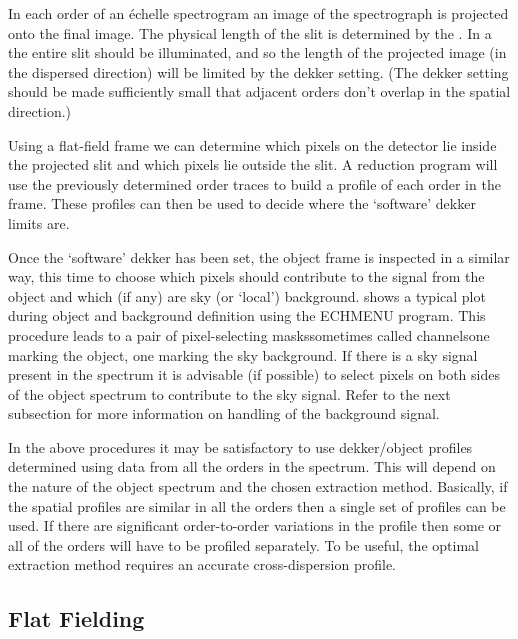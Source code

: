 In each order of an \'{e}chelle spectrogram an image of the spectrograph
is projected onto the final image.  The physical length of the slit
is determined by the .
In a  the entire slit should
be illuminated, and so the length of the projected image (in the dispersed
direction) will be limited by the dekker setting.
(The dekker setting should be made sufficiently small
that adjacent orders don't overlap in the spatial direction.)

Using a flat-field frame we can determine which pixels on the detector lie
inside the projected slit and which pixels lie outside the slit.  A
reduction program will use the previously determined order traces to build
a  profile of each
order in the frame.
These profiles can then be used to decide where the `software' dekker
limits are.

Once the `software' dekker has been set, the object frame is inspected in a
similar way, this time to choose which pixels should contribute to the
signal from the object and which (if any) are sky (or `local') background.
 shows a typical
plot during object and background definition using the ECHMENU program.
This procedure leads to a pair of pixel-selecting
masks\sgspec{---}{ - }sometimes called
channels\sgspec{---}{ - }one marking the object, one marking the sky background.
If there is a sky signal
present in the spectrum it is advisable (if possible) to select pixels on
both sides of the object spectrum to contribute to the sky signal.
Refer to the next subsection for more information on handling of the
background signal.

In the above procedures it may be satisfactory to use dekker/object profiles
determined using data from all the orders in the spectrum.  This will
depend on the nature of the object spectrum and the chosen extraction
method.  Basically, if the spatial profiles are similar in all the orders
then a
single set of profiles can be used.  If there are significant order-to-order
variations in the profile then some or all of the orders will have to be
profiled separately.  To be useful, the optimal extraction method requires
an accurate cross-dispersion profile.


\subsection{\label{se_flat_fields}Flat Fielding}

